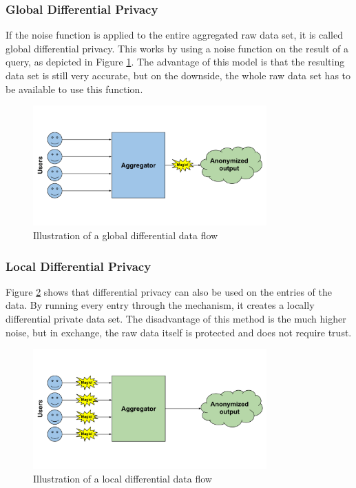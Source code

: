 \subsubsection{Global Differential Privacy}
If the noise function is applied to the entire aggregated raw data set, it is called global differential privacy. This works by using a noise function on the result of a query, as depicted in Figure \ref{fig:global_diff}. The advantage of this model is that the resulting data set is still very accurate, but on the downside, the whole raw data set has to be available to use this function.

\begin{figure}[htpb]
  \centering
  \includegraphics[width=0.8\textwidth]{figures/global_diff.png}
  \caption{Illustration of a global differential data flow\cite{desfontaines}}
  \label{fig:global_diff}
\end{figure}

\subsubsection{Local Differential Privacy}
Figure \ref{fig:local_diff} shows that differential privacy can also be used on the entries of the data. By running every entry through the mechanism, it creates a locally differential private data set. The disadvantage of this method is the much higher noise, but in exchange, the raw data itself is protected and does not require trust.

\begin{figure}[htpb]
  \centering
  \includegraphics[width=0.8\textwidth]{figures/local_diff.png}
  \caption{Illustration of a local differential data flow \cite{desfontaines}} 
  \label{fig:local_diff}
\end{figure}

